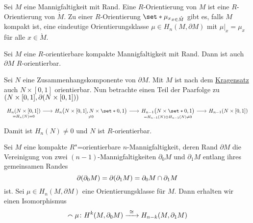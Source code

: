 \begin{bemerkung}[{name=[Orientierung einer Mannigfaltigkeit mit Rand]}]
	Sei $M$ eine Mannigfaltigkeit mit Rand. 
	Eine $R$-Orientierung von $M$ ist eine $R$-Orientierung von $\mathring{M}$.
	Zu einer $R$-Orientierung $\set*{\mu_x}_{x \in \mathring{M}}$ gibt es, falls $M$ kompakt ist, eine eindeutige Orientierungsklasse $\mu \in H_n(M, \partial M)$ mit $\mu|_x = \mu_x$ für alle $x \in \mathring{M}$.
\end{bemerkung}

\begin{lemma}[{name=[Orientierbarkeit des Randes]}]
	Sei $M$ eine $R$-orientierbare kompakte Mannigfaltigkeit mit Rand.
	Dann ist auch $\partial M$ $R$-orientierbar.
\end{lemma}
\begin{beweis}
	Sei $N$ eine Zusammenhangskomponente von $\partial M$.
	Mit $M$ ist nach dem \hyperref[kragensatz]{Kragensatz} auch $N \times [0,1]$ orientierbar.
	Nun betrachte einen Teil der Paarfolge zu $\enbrace*{N \times [0,1], \partial (N \times [0,1])}$
	\[
		\begin{tikzcd}[sep=1.8em]
			\underset{=H_n(N)=0}{H_n(N \times [0,1])} \rar & \underset{\neq 0}{H_n \enbrace[\big]{N \times [0,1], N \times \set*{0,1}}} \rar & \underset{= H_{n-1}(N) \oplus H_{n-1}(N) \neq 0}{H_{n-1} \enbrace[\big]{N \times \set*{0,1}}} \rar & H_{n-1} \enbrace*{N \times [0,1]}
		\end{tikzcd}
	\]
	Damit ist $H_n(N)\neq 0$ und $N$ ist $R$-orientierbar.
\end{beweis}
\begin{satz}[{name={Poincaré-Dualität für Mannigfaltigkeiten mit Rand}}]
	Sei $M$ eine kompakte $R$"=orientierbare $n$-Mannigfaltigkeit, deren Rand $\partial M$ die Vereinigung von zwei $(n-1)$-Mannigfaltigkeiten $\partial_0 M$ und $\partial_1 M$ entlang ihres gemeinsamen Randes 
	\[
		\partial \enbrace*{\partial_0 M } = \partial \enbrace*{\partial_1 M} = \partial_0 M \cap \partial_1 M
	\]
	ist.
	Sei $\mu \in H_n(M, \partial M)$ eine Orientierungsklasse für $M$. 
	Dann erhalten wir einen Isomorphismus 
	\[
		\capp \mu \colon H^k \enbrace*{M, \partial_0 M} \grenzw{\cong} H_{n-k} \enbrace*{M, \partial_1 M}
	\]
\end{satz}
